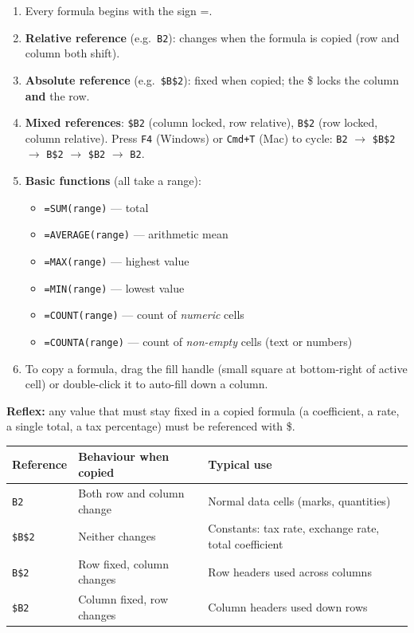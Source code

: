 \documentclass[11pt]{article}
\newcommand{\cle}[1]{{\popxbold\color{popdark}#1}}
\begin{document}
\begin{methode}
\begin{enumerate}
\item Every formula begins with the sign \cle{=}.
\item \textbf{Relative reference} (e.g.\ \texttt{B2}): changes when the formula is copied (row and column both shift).
\item \textbf{Absolute reference} (e.g.\ \texttt{\$B\$2}): fixed when copied; the \$ locks the column \textbf{and} the row.
\item \textbf{Mixed references}: \texttt{\$B2} (column locked, row relative), \texttt{B\$2} (row locked, column relative). Press \texttt{F4} (Windows) or \texttt{Cmd+T} (Mac) to cycle: \texttt{B2} $\rightarrow$ \texttt{\$B\$2} $\rightarrow$ \texttt{B\$2} $\rightarrow$ \texttt{\$B2} $\rightarrow$ \texttt{B2}.
\item \textbf{Basic functions} (all take a range):
\begin{itemize}
\item \texttt{=SUM(range)} --- total
\item \texttt{=AVERAGE(range)} --- arithmetic mean
\item \texttt{=MAX(range)} --- highest value
\item \texttt{=MIN(range)} --- lowest value
\item \texttt{=COUNT(range)} --- count of \emph{numeric} cells
\item \texttt{=COUNTA(range)} --- count of \emph{non-empty} cells (text or numbers)
\end{itemize}
\item To copy a formula, drag the \cle{fill handle} (small square at bottom-right of active cell) or double-click it to auto-fill down a column.
\end{enumerate}
\textbf{Reflex:} any value that must stay fixed in a copied formula (a coefficient, a rate, a single total, a tax percentage) must be referenced with \$.
\end{methode}

\begin{aretenir}
\begin{center}
\begin{tabularx}{\linewidth}{|l|X|X|}\hline
\textbf{Reference} & \textbf{Behaviour when copied} & \textbf{Typical use} \\ \hline
\texttt{B2} & Both row and column change & Normal data cells (marks, quantities) \\ \hline
\texttt{\$B\$2} & Neither changes & Constants: tax rate, exchange rate, total coefficient \\ \hline
\texttt{B\$2} & Row fixed, column changes & Row headers used across columns \\ \hline
\texttt{\$B2} & Column fixed, row changes & Column headers used down rows \\ \hline
\end{tabularx}
\end{center}
\end{aretenir}
\end{document}
